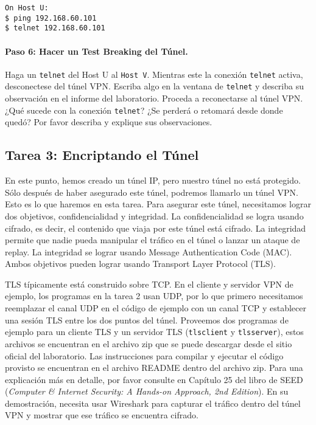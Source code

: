 \begin{lstlisting}
On Host U:
$ ping 192.168.60.101
$ telnet 192.168.60.101
\end{lstlisting}


\paragraph{Paso 6: Hacer un Test Breaking del Túnel.} 
Haga un \texttt{telnet} del Host U al \texttt{Host V}. Mientras este la conexión \texttt{telnet} activa, desconectese del túnel VPN. Escriba algo en la ventana de \texttt{telnet} y describa su observación en el informe del laboratorio.
Proceda a reconectarse al túnel VPN. ¿Qué sucede con la conexión \texttt{telnet}? ¿Se perderá o retomará desde donde quedó?
Por favor describa y explique sus observaciones.


\subsection{Tarea 3: Encriptando el Túnel}


En este punto, hemos creado un túnel IP, pero nuestro túnel no está protegido.
Sólo después de haber asegurado este túnel, podremos llamarlo un túnel VPN.
Esto es lo que haremos en esta tarea.
Para asegurar este túnel, necesitamos lograr dos objetivos, confidencialidad y integridad.
La confidencialidad se logra usando cifrado, es decir, el contenido que viaja por este túnel está cifrado.
La integridad permite que nadie pueda manipular el tráfico en el túnel o lanzar un ataque de replay.
La integridad se lograr usando Message Authentication Code (MAC).
Ambos objetivos pueden lograr usando Transport Layer Protocol (TLS). 

TLS típicamente está construido sobre TCP. En el cliente y servidor VPN de ejemplo, los programas en la tarea 2 usan UDP, por lo que primero necesitamos reemplazar el canal UDP en el código de ejemplo con un canal TCP y establecer una sesión TLS entre los dos puntos del túnel. Proveemos dos programas de ejemplo para un cliente TLS y un servidor TLS (\texttt{tlsclient} y \texttt{tlsserver}), estos archivos se encuentran en el archivo zip que se puede descargar desde el sitio oficial del laboratorio.
Las instrucciones para compilar y ejecutar el código provisto se encuentran en el archivo README dentro del archivo zip.
Para una explicación más en detalle, por favor consulte en Capítulo 25 del libro de SEED (\textit{Computer \& Internet Security: A Hands-on Approach, 2nd Edition}). En su demostración, necesita usar Wireshark para capturar el tráfico dentro del túnel VPN y mostrar que ese tráfico se encuentra cifrado.

